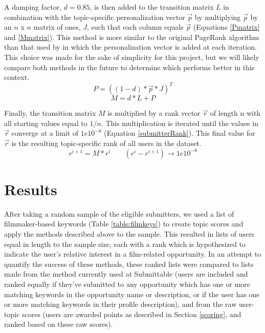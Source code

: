 \documentclass[12pt]{report}   %
\begin{document}
A damping factor, $d = 0.85$, is then added to the transition matrix $L$ in combination with the topic-specific personalization vector $\vec{p}$ by multiplying $\vec{p}$ by an $n$ x $n$ matrix of ones, $J$, such that each column equals $\vec{p}$ (Equations \ref{Pmatrix} and \ref{Mmatrix}). This method is more similar to the original PageRank algorithm than that used by  in which the personalization vector is added at each iteration. This choice was made for the sake of simplicity for this project, but we will likely compare both methods in the future to determine which performs better in this context.
\begin{equation}
\label{Pmatrix}
P=((1-d)*\vec{p}*J)^{T}
\end{equation}
\begin{equation}
\label{Mmatrix}
M=d*L+P
\end{equation}

Finally, the transition matrix $M$ is multiplied by a rank vector $\vec{r}$ of length n with all starting values equal to $1/n$. This multiplication is iterated until the values in $\vec{r}$ converge at a limit of $1e10^{-8}$ (Equation \ref{submitterRank}). This final value for $\vec{r}$ is the resulting topic-specific rank of all users in the dataset.
\begin{equation}
\label{submitterRank}
r^{i+1}=M*r^{i} \;\; \;\;\;\;\;(r^{i}-r^{i+1})\rightarrow1e10^{-8}
\end{equation}


\chapter{Results}

After taking a random sample of the eligible submitters, we used a list of filmmaker-based keywords (Table \ref{table:filmkeys}) to create topic scores and apply the methods described above to the sample. This resulted in lists of users equal in length to the sample size, each with a rank which is hypothesized to indicate the user's relative interest in a film-related opportunity. In an attempt to quantify the success of these methods, these ranked lists were compared to lists made from the method currently used at Submittable (users are included and ranked equally if they've submitted to any opportunity which has one or more matching keywords in the opportunity name or description, or if the user has one or more matching keywords in their profile description), and from the raw user-topic scores (users are awarded points as described in Section \ref{scoring}, and ranked based on these raw scores). 
\end{document}
